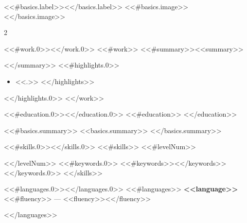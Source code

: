 \documentclass[10pt,a4paper]{altacv}
\begin{document}
<<#basics.label>><</basics.label>>
<<#basics.image>><</basics.image>>


\makecvheader


\begin{paracol}{2}

<<#work.0>><</work.0>>
<<#work>>
<<#summary>><<summary>>\par<</summary>>
<<#highlights.0>>
\begin{itemize}
<<#highlights>>\item <<.>>
<</highlights>>
\end{itemize}
<</highlights.0>>
\divider
<</work>>

<<#education.0>><</education.0>>
<<#education>>
\divider
<</education>>

\switchcolumn

<<#basics.summary>>
<<basics.summary>>
\medskip
<</basics.summary>>

<<#skills.0>><</skills.0>>
<<#skills>>
<<#levelNum>>\par<</levelNum>>
<<#keywords.0>>
<<#keywords>><</keywords>>
<</keywords.0>>
\divider
<</skills>>

<<#languages.0>><</languages.0>>
<<#languages>>
\textbf{<<language>>}<<#fluency>> --- <<fluency>><</fluency>>\par
<</languages>>

\end{paracol}
\end{document}
